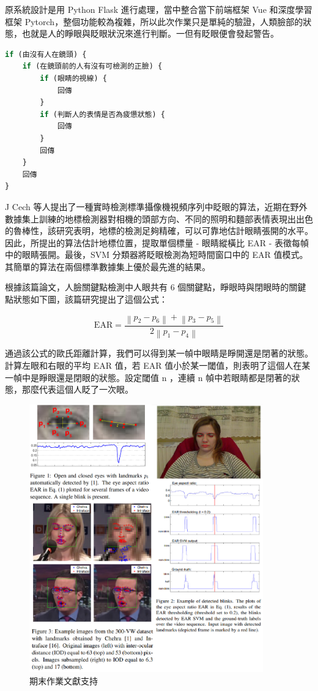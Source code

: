 \documentclass[10pt,UTF8]{ctexart}
\begin{document}
原系統設計是用 Python Flask 進行處理，當中整合當下前端框架 Vue 和深度學習框架 Pytorch，整個功能較為複雜，所以此次作業只是單純的驗證，人類臉部的狀態，也就是人的睜眼與眨眼狀況來進行判斷。一但有眨眼便會發起警告。

\begin{lstlisting}[language={python}]
if (由沒有人在鏡頭) {
    if (在鏡頭前的人有沒有可檢測的正臉) {
        if (眼睛的視線) {
            回傳
        }
        if (判斷人的表情是否為疲憊狀態) {
            回傳
        }
        回傳
    }
    回傳
}
\end{lstlisting}

J Cech 等人提出了一種實時檢測標準攝像機視頻序列中眨眼的算法，近期在野外數據集上訓練的地標檢測器對相機的頭部方向、不同的照明和麵部表情表現出出色的魯棒性，該研究表明，地標的檢測足夠精確，可以可靠地估計眼睛張開的水平。因此，所提出的算法估計地標位置，提取單個標量 - 眼睛縱橫比 EAR - 表徵每幀中的眼睛張開。最後，SVM 分類器將眨眼檢測為短時間窗口中的 EAR 值模式。其簡單的算法在兩個標準數據集上優於最先進的結果。

根據該篇論文，人臉關鍵點檢測中人眼共有 6 個關鍵點，睜眼時與閉眼時的關鍵點狀態如下圖，該篇研究提出了這個公式：

\begin{equation}
\mathrm{EAR}=\frac{\left\|p_{2}-p_{6}\right\|+\left\|p_{3}-p_{5}\right\|}{2\left\|p_{1}-p_{4}\right\|}
\end{equation}

通過該公式的歐氏距離計算，我們可以得到某一幀中眼睛是睜開還是閉著的狀態。計算左眼和右眼的平均 EAR 值，若 EAR 值小於某一閾值，則表明了這個人在某一幀中是睜眼還是閉眼的狀態。設定閾值 n ，連續 n 幀中若眼睛都是閉著的狀態，那麼代表這個人眨了一次眼。

\begin{figure}[H]
\centering 
\includegraphics[width=0.90\textwidth]{ch3m1.png} 
\caption{期末作業文獻支持}
\label{Test}
\end{figure}
\end{document}
